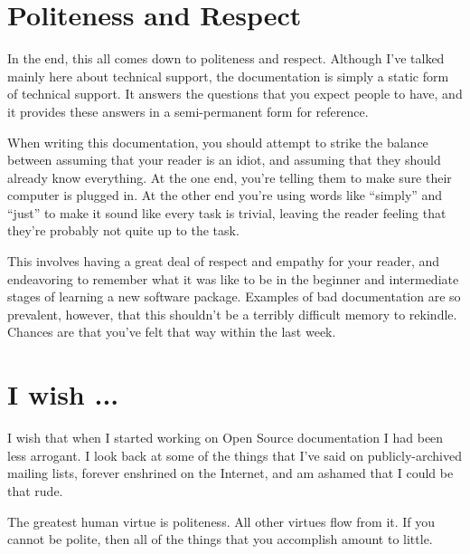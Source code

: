 \section*{Politeness and Respect}
In the end, this all comes down to politeness and respect. Although I’ve talked mainly here about technical support, the documentation is simply a static form of technical support. It answers the questions that you expect people to have, and it provides these answers in a semi-permanent form for reference.

When writing this documentation, you should attempt to strike the balance between assuming that your reader is an idiot, and assuming that they should already know everything. At the one end, you’re telling them to make sure their computer is plugged in. At the other end you’re using words like “simply” and “just” to make it sound like every task is trivial, leaving the reader feeling that they’re probably not quite up to the task.

This involves having a great deal of respect and empathy for your reader, and endeavoring to remember what it was like to be in the beginner and intermediate stages of learning a new software package. Examples of bad documentation are so prevalent, however, that this shouldn’t be a terribly difficult memory to rekindle. Chances are that you’ve felt that way within the last week.

\section*{I wish ...}
I wish that when I started working on Open Source documentation I had been less arrogant. I look back at some of the things that I’ve said on publicly-archived mailing lists, forever enshrined on the Internet, and am ashamed that I could be that rude.

The greatest human virtue is politeness. All other virtues flow from it. If you cannot be polite, then all of the things that you accomplish amount to little.
